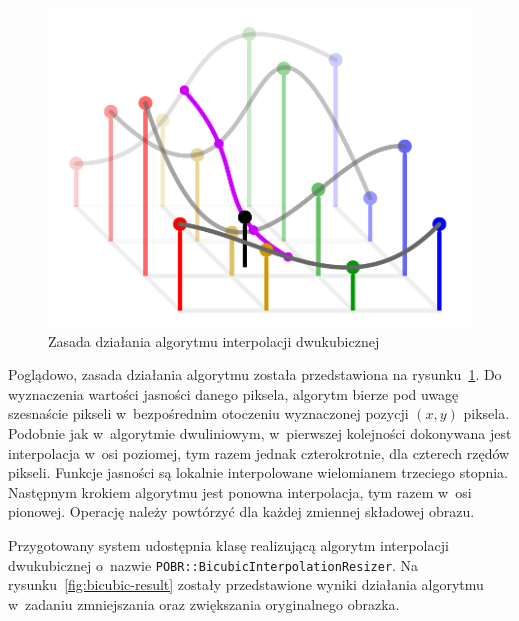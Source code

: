 \begin{figure}[h]
    \centering
    \includegraphics[width=\columnwidth]{figures/bicubic.png}
    \caption{Zasada działania algorytmu interpolacji dwukubicznej~\cite{WikipediaEN:bicubicimg}}
    \label{fig:bicubic-example}
\end{figure}

Poglądowo, zasada działania algorytmu została przedstawiona na rysunku~\ref{fig:bicubic-example}. Do wyznaczenia wartości jasności danego piksela, algorytm bierze pod uwagę szesnaście pikseli w~bezpośrednim otoczeniu wyznaczonej pozycji $(x,y)$ piksela. Podobnie jak w~algorytmie dwuliniowym, w~pierwszej kolejności dokonywana jest interpolacja w~osi poziomej, tym razem jednak czterokrotnie, dla czterech rzędów pikseli. Funkcje jasności są lokalnie interpolowane wielomianem trzeciego stopnia. Następnym krokiem algorytmu jest ponowna interpolacja, tym razem w~osi pionowej. Operację należy powtórzyć dla każdej zmiennej składowej obrazu.

Przygotowany system udostępnia klasę realizującą algorytm interpolacji dwukubicznej o~nazwie \texttt{POBR::BicubicInterpolationResizer}. Na rysunku~\ref{fig:bicubic-result} zostały przedstawione wyniki działania algorytmu w~zadaniu zmniejszania oraz zwiększania oryginalnego obrazka.

